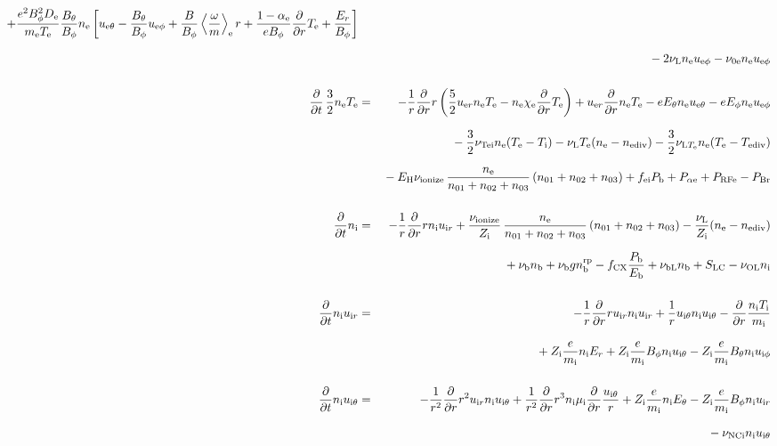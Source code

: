 \documentclass[11pt]{article}
\def\r#1{{\rm#1}}
\def\ddt{\frac{\partial}{\partial t}}
\def\ddr{\frac{\partial}{\partial r}}
\def\ave#1{\left\langle#1\right\rangle}
\def\me{m_\r{e}}
\def\mi{m_\r{i}}
\def\mb{m_\r{b}}
\def\mui{\mu_\r{i}}
\def\De{D_\r{e}}
\def\Di{D_\r{i}}
\def\chie{\chi_\r{e}}
\def\nee{n_\r{e}}
\def\ni{n_\r{i}}
\def\nb{n_\r{b}}
\def\uer{u_{\r{e}r}}
\def\uir{u_{\r{i}r}}
\def\ueth{u_{\r{e}\theta}}
\def\uith{u_{\r{i}\theta}}
\def\ueph{u_{\r{e}\phi}}
\def\uiph{u_{\r{i}\phi}}
\def\ubph{u_{\r{b}\phi}}
\def\Er{E_r}
\def\Eth{E_\theta}
\def\Eph{E_\phi}
\def\Bth{B_\theta}
\def\Bph{B_\phi}
\def\Te{T_\r{e}}
\def\Ti{T_\r{i}}
\def\nna{n_{01}}
\def\nnb{n_{02}}
\def\nnc{n_{03}}
\def\Zi{Z_\r{i}}
\def\Pb{P_\r{b}}
\def\Eb{E_\r{b}}
\def\PRFe{P_\r{RFe}}
\def\PBr{P_\r{Br}}
\def\EH{E_\r{H}}
\def\fei{f_\r{ei}}
\def\nbrp{n_\r{b}^\r{rp}}
\def\fCX{f_\r{CX}}
\def\Palpe{P_{\alpha\r{e}}}
\def\nuNCi{\nu_\r{NCi}}
\def\nube{\nu_\r{be}}
\def\nune{\nu_\r{0e}}
\def\nuL{\nu_\r{L}}
\def\nuion{\nu_\r{ionize}}
\def\nub{\nu_\r{b}}
\def\nuTei{\nu_\r{Tei}}
\def\vb{v_\r{b}}
\def\nediv{n_\r{ediv}}
\def\Tediv{T_\r{ediv}}
\def\nuLTe{\nu_{\r{L}T_\r{e}}}
\def\nuOL{\nu_\r{OL}}
\def\nubL{\nu_\r{bL}}
\begin{document}
\begin{eqnarray}
  + \frac{e^2 \Bph^2 \De}{\me\Te}\frac{\Bth}{\Bph}\nee
    \left[\ueth - \frac{\Bth}{\Bph}\ueph
     + \frac{B}{\Bph}\ave{\frac{\omega}{m}}_\r{e}r
     + \frac{1-\alpha_\r{e}}{e\Bph}\ddr \Te + \frac{\Er}{\Bph}\right]
%
\nonumber\\[2.5mm]&&{}
%
  - 2 \nuL \nee \ueph
%
  - \nune \nee \ueph
%
%
\\[5mm]
  \ddt \, \frac{3}{2} \nee \Te &=&
%
 - \frac{1}{r} \ddr r
   \left( \frac{5}{2} \uer \nee \Te - \nee \chie \ddr \Te \right)
%
  +  \uer \ddr \nee \Te
%
  -  e \Eth \nee \ueth
%
  -  e \Eph \nee \ueph 
\nonumber\\[2.5mm]&&{}
%
  - \frac{3}{2} \nuTei \nee (\Te - \Ti)
%
%
  - \nuL \Te (\nee - \nediv)
%
  - \frac{3}{2} \nuLTe \nee (\Te - \Tediv)
\nonumber\\[2.5mm]&&{}
%
  - \EH \nuion\, \frac{\nee}{\nna + \nnb + \nnc}\, (\nna + \nnb + \nnc)
%
  + \fei \Pb
%
  + \Palpe
%
  + \PRFe
%
  - \PBr
\\[5mm]
%
  \ddt\ni &=&
%
  - \frac{1}{r} \ddr r \ni \uir
%
  + \frac{\nuion}{\Zi}\, \frac{\nee}{\nna + \nnb + \nnc}\, (\nna + \nnb
  + \nnc)
%
  - \frac{\nuL}{\Zi} (\nee - \nediv) 
\nonumber\\[2.5mm]&&{}
%
  + \nub \nb
%
  + \nub g \nbrp
%
  - \fCX \frac{\Pb}{\Eb}
%
  + \nubL \nb
%
  + S_\r{LC}
%
  - \nuOL \ni
%
\\[5mm]
  \ddt \ni \uir &=&
%
  - \frac{1}{r} \ddr r \uir \ni \uir
%
  + \frac{1}{r} \uith \ni \uith
%
  - \ddr \frac{\ni \Ti}{\mi}
\nonumber\\[3mm]&&{}
%
  + \Zi \frac{e}{\mi}\ni \Er
%
  + \Zi \frac{e}{\mi} \Bph \ni \uith
%
  - \Zi \frac{e}{\mi} \Bth \ni \uiph
\\[5mm]
  \ddt \ni \uith &=&
%
  - \frac{1}{r^2} \ddr r^2 \uir \ni \uith
%
  + \frac{1}{r^2} \ddr r^3 \ni \mui \ddr \frac{\uith}{r}
%
  + \Zi \frac{e}{\mi} \ni \Eth
%
  - \Zi \frac{e}{\mi} \Bph \ni \uir
\nonumber\\[2.5mm]&&{}
%
  - \nuNCi \ni \uith

\end{eqnarray}
\end{document}
